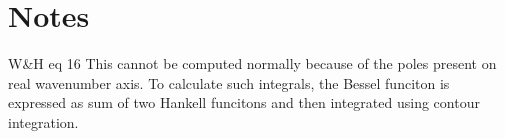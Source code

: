 \documentclass[11pt,titlepage,fleqn]{article}
\begin{document}
\pagebreak
\section{Notes}
W\&H eq 16
This cannot be computed normally because of the poles present on real wavenumber axis. 
To calculate such integrals, the Bessel funciton is expressed as sum of two Hankell funcitons and then integrated using contour integration. 
\clearpage
\pagebreak
\fi

%
%
\end{document}
